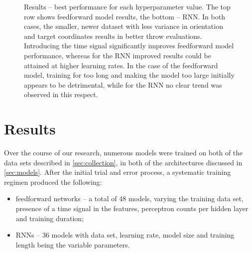 \documentclass{article}
\begin{document}
\begin{figure}[]
	\centering
	\caption{Results -- best performance for each hyperparameter value. The top row shows feedforward model results, the bottom -- RNN. In both cases, the smaller, newer dataset with less variance in orientation and target coordinates results in better throw evaluations.  Introducing the time signal significantly improves feedforward model performance, whereas for the RNN improved results could be attained at higher learning rates. In the case of the feedforward model, training for too long and making the model too large initially appears to be detrimental, while for the RNN no clear trend was observed in this respect.}
	\label{fig:rnn_naive_best}
\end{figure}

\section{Results}
\label{sec:results}

Over the course of our research, numerous models were trained on both of the data sets described in \ref{sec:collection}, in both of the architectures discussed in \ref{sec:models}. After the initial trial and error process, a systematic training regimen produced the following:

\begin{itemize}
	\item feedforward networks -- a total of 48 models, varying the training data set, presence of a time signal in the features, perceptron counts per hidden layer and training duration;
	\item RNNs -- 36 models with data set, learning rate, model size and training length being the variable parameters.
\end{itemize}
\end{document}
